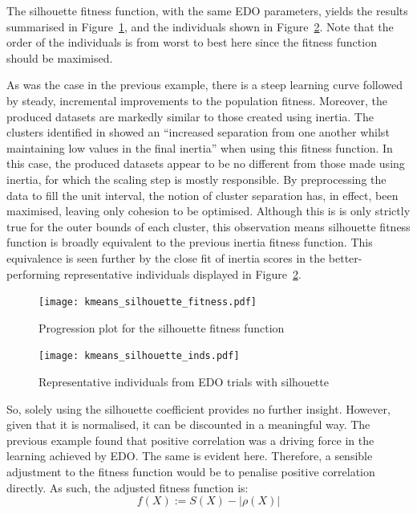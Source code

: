The silhouette fitness function, with the same EDO parameters, yields the
results summarised in Figure~\ref{fig:kmeans_silhouette_fitness}, and the
individuals shown in Figure~\ref{fig:kmeans_silhouette_inds}. Note that the
order of the individuals is from worst to best here since the fitness function
should be maximised.

As was the case in the previous example, there is a steep learning curve
followed by steady, incremental improvements to the population fitness.
Moreover, the produced datasets are markedly similar to those created using
inertia. The clusters identified in \cite{Wilde2020:edo} showed an ``increased
separation from one another whilst maintaining low values in the final inertia''
when using this fitness function. In this case, the produced datasets appear to
be no different from those made using inertia, for which the scaling step is
mostly responsible. By preprocessing the data to fill the unit interval, the
notion of cluster separation has, in effect, been maximised, leaving only
cohesion to be optimised. Although this is is only strictly true for the outer
bounds of each cluster, this observation means silhouette fitness function is
broadly equivalent to the previous inertia fitness function. This equivalence is
seen further by the close fit of inertia scores in the better-performing
representative individuals displayed in Figure~\ref{fig:kmeans_silhouette_inds}.

\begin{figure}
    \centering
    \texttt{[image: kmeans\_silhouette\_fitness.pdf]}
    \caption{%
        Progression plot for the silhouette fitness function
    }\label{fig:kmeans_silhouette_fitness}
\end{figure}

\begin{figure}
    \centering
    \texttt{[image: kmeans\_silhouette\_inds.pdf]}
    \caption{%
        Representative individuals from EDO trials with silhouette
    }\label{fig:kmeans_silhouette_inds}
\end{figure}

So, solely using the silhouette coefficient provides no further insight.
However, given that it is normalised, it can be discounted in a meaningful way.
The previous example found that positive correlation was a driving force in the
learning achieved by EDO. The same is evident here. Therefore, a sensible
adjustment to the fitness function would be to penalise positive correlation
directly. As such, the adjusted fitness function is:
\begin{equation}\label{eq:discounted_silhouette}
f(X) := S(X) - \left|\rho(X)\right|
\end{equation}


